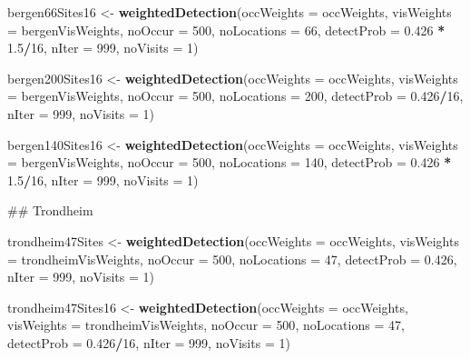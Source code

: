 \documentclass[]{article}
\newenvironment{Shaded}{\begin{snugshade}}{\end{snugshade}}
\newcommand{\KeywordTok}[1]{\textcolor[rgb]{0.13,0.29,0.53}{\textbf{#1}}}
\newcommand{\DataTypeTok}[1]{\textcolor[rgb]{0.13,0.29,0.53}{#1}}
\newcommand{\DecValTok}[1]{\textcolor[rgb]{0.00,0.00,0.81}{#1}}
\newcommand{\FloatTok}[1]{\textcolor[rgb]{0.00,0.00,0.81}{#1}}
\newcommand{\StringTok}[1]{\textcolor[rgb]{0.31,0.60,0.02}{#1}}
\newcommand{\OperatorTok}[1]{\textcolor[rgb]{0.81,0.36,0.00}{\textbf{#1}}}
\newcommand{\NormalTok}[1]{#1}
\begin{document}
\begin{Shaded}
\begin{Highlighting}[]
\NormalTok{bergen66Sites16 <-}\StringTok{ }\KeywordTok{weightedDetection}\NormalTok{(}\DataTypeTok{occWeights =}\NormalTok{ occWeights, }\DataTypeTok{visWeights =}\NormalTok{ bergenVisWeights, }
    \DataTypeTok{noOccur =} \DecValTok{500}\NormalTok{, }\DataTypeTok{noLocations =} \DecValTok{66}\NormalTok{, }\DataTypeTok{detectProb =} \FloatTok{0.426} \OperatorTok{*}\StringTok{ }\FloatTok{1.5}\OperatorTok{/}\DecValTok{16}\NormalTok{, }\DataTypeTok{nIter =} \DecValTok{999}\NormalTok{, }
    \DataTypeTok{noVisits =} \DecValTok{1}\NormalTok{)}

\NormalTok{bergen200Sites16 <-}\StringTok{ }\KeywordTok{weightedDetection}\NormalTok{(}\DataTypeTok{occWeights =}\NormalTok{ occWeights, }\DataTypeTok{visWeights =}\NormalTok{ bergenVisWeights, }
    \DataTypeTok{noOccur =} \DecValTok{500}\NormalTok{, }\DataTypeTok{noLocations =} \DecValTok{200}\NormalTok{, }\DataTypeTok{detectProb =} \FloatTok{0.426}\OperatorTok{/}\DecValTok{16}\NormalTok{, }\DataTypeTok{nIter =} \DecValTok{999}\NormalTok{, }\DataTypeTok{noVisits =} \DecValTok{1}\NormalTok{)}

\NormalTok{bergen140Sites16 <-}\StringTok{ }\KeywordTok{weightedDetection}\NormalTok{(}\DataTypeTok{occWeights =}\NormalTok{ occWeights, }\DataTypeTok{visWeights =}\NormalTok{ bergenVisWeights, }
    \DataTypeTok{noOccur =} \DecValTok{500}\NormalTok{, }\DataTypeTok{noLocations =} \DecValTok{140}\NormalTok{, }\DataTypeTok{detectProb =} \FloatTok{0.426} \OperatorTok{*}\StringTok{ }\FloatTok{1.5}\OperatorTok{/}\DecValTok{16}\NormalTok{, }\DataTypeTok{nIter =} \DecValTok{999}\NormalTok{, }
    \DataTypeTok{noVisits =} \DecValTok{1}\NormalTok{)}




\NormalTok{## Trondheim}

\NormalTok{trondheim47Sites <-}\StringTok{ }\KeywordTok{weightedDetection}\NormalTok{(}\DataTypeTok{occWeights =}\NormalTok{ occWeights, }\DataTypeTok{visWeights =}\NormalTok{ trondheimVisWeights, }
    \DataTypeTok{noOccur =} \DecValTok{500}\NormalTok{, }\DataTypeTok{noLocations =} \DecValTok{47}\NormalTok{, }\DataTypeTok{detectProb =} \FloatTok{0.426}\NormalTok{, }\DataTypeTok{nIter =} \DecValTok{999}\NormalTok{, }\DataTypeTok{noVisits =} \DecValTok{1}\NormalTok{)}

\NormalTok{trondheim47Sites16 <-}\StringTok{ }\KeywordTok{weightedDetection}\NormalTok{(}\DataTypeTok{occWeights =}\NormalTok{ occWeights, }\DataTypeTok{visWeights =}\NormalTok{ trondheimVisWeights, }
    \DataTypeTok{noOccur =} \DecValTok{500}\NormalTok{, }\DataTypeTok{noLocations =} \DecValTok{47}\NormalTok{, }\DataTypeTok{detectProb =} \FloatTok{0.426}\OperatorTok{/}\DecValTok{16}\NormalTok{, }\DataTypeTok{nIter =} \DecValTok{999}\NormalTok{, }\DataTypeTok{noVisits =} \DecValTok{1}\NormalTok{)}


\end{Highlighting}
\end{Shaded}
\end{document}
